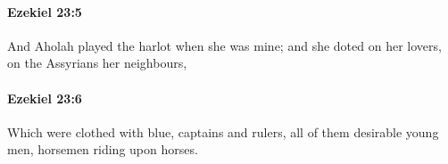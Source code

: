		\paragraph{Ezekiel 23:5} %
			\label{EZEKIEL-23-5}

			And Aholah played the harlot when she was mine; and she doted on her lovers, on the Assyrians her neighbours,


		\paragraph{Ezekiel 23:6} %
			\label{EZEKIEL-23-6}

			Which were clothed with blue, captains and rulers, all of them desirable young men, horsemen riding upon horses.


